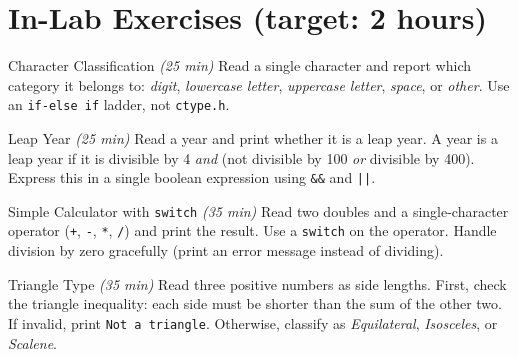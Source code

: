 \documentclass[11pt]{article}
\begin{document}
\section*{In-Lab Exercises (target: 2 hours)}

\begin{labexercise}{Character Classification \hfill {\small \itshape (25 min)}}
Read a single character and report which category it belongs to:
\textit{digit}, \textit{lowercase letter}, \textit{uppercase letter}, \textit{space}, or
\textit{other}. Use an \texttt{if-else if} ladder, not \texttt{ctype.h}.
\end{labexercise}

\begin{labexercise}{Leap Year \hfill {\small \itshape (25 min)}}
Read a year and print whether it is a leap year. A year is a leap year if it is
divisible by 4 \emph{and} (not divisible by 100 \emph{or} divisible by 400). Express
this in a single boolean expression using \texttt{\&\&} and \texttt{||}.
\end{labexercise}

\begin{labexercise}{Simple Calculator with \texttt{switch} \hfill {\small \itshape (35 min)}}
Read two doubles and a single-character operator (\texttt{+}, \texttt{-}, \texttt{*}, \texttt{/})
and print the result. Use a \texttt{switch} on the operator. Handle division by zero
gracefully (print an error message instead of dividing).
\end{labexercise}

\begin{labexercise}{Triangle Type \hfill {\small \itshape (35 min)}}
Read three positive numbers as side lengths. First, check the triangle inequality:
each side must be shorter than the sum of the other two. If invalid, print
\texttt{Not a triangle}. Otherwise, classify as \textit{Equilateral}, \textit{Isosceles},
or \textit{Scalene}.
\end{labexercise}
\end{document}
